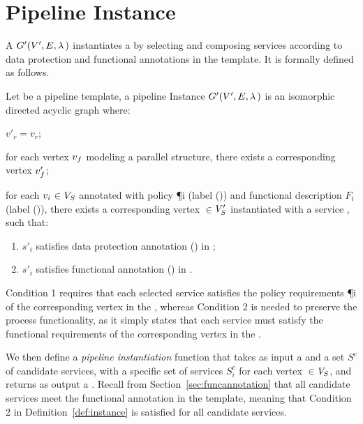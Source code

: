 \section{Pipeline Instance}\label{sec:instance}
A \pipelineInstance $G'(V',E,\lambda\,)$ instantiates a \pipelineTemplate \tChartFunction by selecting and composing services according to data protection and functional annotations in the template. It is formally defined as follows.
\vspace{0.5em}
\begin{definition}\label{def:instance}
  Let \tChartFunction be a pipeline template, a pipeline Instance $G'(V',E,\lambda\,)$ is an isomorphic directed acyclic graph where:
  \begin{enumerate*}[label=\textit{\roman*})]
    \item $v'_r$$=$$v_r$;
    \item for each vertex $v_{f}$ modeling a parallel structure, there exists a corresponding vertex $v'_{f}$;
    \item for each $v_{i}$$\in$$V_S$ annotated with policy \P{i} (label \myLambda()) and functional description $F_i$ (label \myGamma()), there exists a corresponding vertex $\in$$V'_S$ instantiated with a service , such that:
  \end{enumerate*}
  \begin{enumerate}[label=\arabic*)]
    \item $s'_i$ satisfies data protection annotation \myLambda() in \tChartFunction;
    \item $s'_i$ satisfies functional annotation \myGamma() in \tChartFunction.
  \end{enumerate}
\end{definition}
\vspace{0.5em}
Condition 1 requires that each selected service  satisfies the policy requirements \P{i} of the corresponding vertex  in the \pipelineTemplate, whereas Condition 2 is needed to preserve the process functionality, as it simply states that each service  must satisfy the functional requirements  of the corresponding vertex  in the \pipelineTemplate.

We then define a \emph{pipeline instantiation} function that takes as input a \pipelineTemplate \tChartFunction and a set $S^c$ of candidate services, with a specific set of services $S^c_{i}$ for each vertex $\in$$V_S$, and returns as output a \pipelineInstance \iChartFunction. Recall from Section~\ref{sec:funcannotation} that all candidate services meet the functional annotation in the template, meaning that Condition 2 in Definition~\ref{def:instance} is satisfied for all candidate services.

